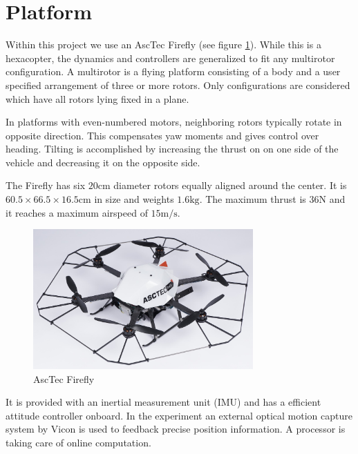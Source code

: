 \section{Platform}
Within this project we use an AscTec Firefly (see figure \ref{pics:firefly}). While this is a hexacopter, the dynamics and controllers are generalized to fit any multirotor configuration. A multirotor is a flying platform consisting of a body and a user specified arrangement of three or more rotors. Only configurations are considered which have all rotors lying fixed in a plane.

In platforms with even-numbered motors, neighboring rotors typically rotate in opposite direction. This compensates yaw moments and gives control over heading. Tilting is accomplished by increasing the thrust on on one side of the vehicle and decreasing it on the opposite side.

The Firefly has six $20 \si{\cm}$ diameter rotors equally aligned around the center. It is $60.5 \times 66.5 \times 16.5 \si{\cm}$ in size and weights $1.6 \si{\kg}$. The maximum thrust is $36 \si{\N}$ and it reaches a maximum airspeed of $15 \si{\metre\per\second}$.

\begin{figure}
   \centering
   \includegraphics[width=0.75\textwidth]{images/firefly.jpg}
   \caption{AscTec Firefly \cite{www:asctec}}
   \label{pics:firefly}
\end{figure}

It is provided with an inertial measurement unit (IMU) and has a efficient attitude controller onboard. In the experiment an external optical motion capture system by Vicon is used to feedback precise position information. A processor is taking care of online computation.

